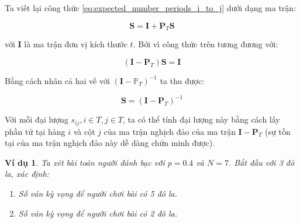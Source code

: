 \documentclass[14pt, a4paper]{article}
\numberwithin{equation}{section}
\numberwithin{figure}{section}
\theoremstyle{sltheorem}
\newtheorem{vd}{Ví dụ}
\theoremstyle{soltheorem}
\numberwithin{dl}{section}
\numberwithin{vd}{section}
\begin{document}
    Ta viết lại công thức \ref{eq:expected_number_periods_i_to_j} dưới dạng ma trận:

    \begin{equation*}
        \mathbf{S} = \mathbf{I} + \mathbf{P}_T \mathbf{S}
    \end{equation*}

    với $\mathbf{I}$ là ma trận đơn vị kích thước $t$. Bởi vì công thức trên tương đương với:

    \begin{equation*}
        (\mathbf{I} - \mathbf{P}_T) \mathbf{S} = \mathbf{I}
    \end{equation*}

    Bằng cách nhân cả hai vế với $(\mathbf{I} - \mathbb{P}_T)^{-1}$ ta thu được:

    \begin{equation*}
        \mathbf{S} = (\mathbf{I} - \mathbf{P}_T)^{-1}
    \end{equation*}

    Với mỗi đại lượng $s_{ij}, i \in T, j \in T$, ta có thể tính đại lượng này bằng cách lấy phần tử tại hàng $i$ và cột $j$ của ma trận nghịch đảo của ma trận $\mathbf{I} - \mathbf{P}_T$ (sự tồn tại của ma trận nghịch đảo này dễ dàng chứn minh được).

    \begin{vd} \label{vd:gambler-ruin-problem}
        Ta xét bài toán người đánh bạc với $p=0.4$ và $N=7$. Bắt đầu với 3 đô la, xác định:
        \begin{enumerate}[label=(\alph*)]
            \item Số ván kỳ vọng để người chơi bài có 5 đô la.
            \item Số ván kỳ vọng để người chơi bài có 2 đô la.
        \end{enumerate}
    \end{vd}
\end{document}
